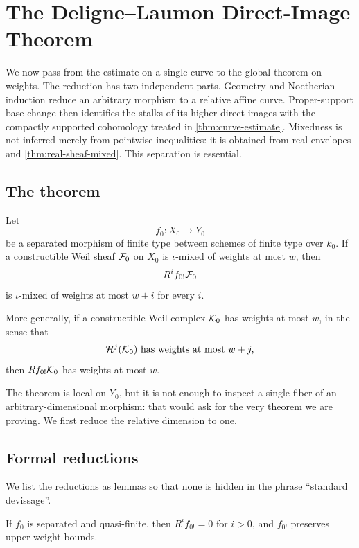 \chapter{The Deligne--Laumon Direct-Image Theorem}
\label{chap:global-weights}

We now pass from the estimate on a single curve to the global theorem on
weights.  The reduction has two independent parts.  Geometry and
Noetherian induction reduce an arbitrary morphism to a relative affine
curve.  Proper-support base change then identifies the stalks of its
higher direct images with the compactly supported cohomology treated in
\cref{thm:curve-estimate}.  Mixedness is not inferred merely from
pointwise inequalities: it is obtained from real envelopes and
\cref{thm:real-sheaf-mixed}.  This separation is essential.

\section{The theorem}

\begin{theorem}
\label{thm:deligne-laumon-direct-image}
Let
\[
  f_0:X_0\longrightarrow Y_0
\]
be a separated morphism of finite type between schemes of finite type
over \(k_0\).  If a constructible Weil sheaf \(\mathcal F_0\) on \(X_0\) is
\(\iota\)-mixed of weights at most \(w\), then
\[
  R^i f_{0!}\mathcal F_0
\]
is \(\iota\)-mixed of weights at most \(w+i\) for every \(i\).

More generally, if a constructible Weil complex \(\mathcal K_0\) has weights at
most \(w\), in the sense that
\[
  \mathcal H^j(\mathcal K_0)\text{ has weights at most }w+j,
\]
then \(Rf_{0!}\mathcal K_0\) has weights at most \(w\).
\end{theorem}

The theorem is local on \(Y_0\), but it is not enough to inspect a single
fiber of an arbitrary-dimensional morphism: that would ask for the very
theorem we are proving.  We first reduce the relative dimension to one.

\section{Formal reductions}

We list the reductions as lemmas so that none is hidden in the phrase
``standard devissage''.

\begin{lemma}
\label{lem:weights-quasifinite}
If \(f_0\) is separated and quasi-finite, then \(R^if_{0!}=0\) for
\(i>0\), and \(f_{0!}\) preserves upper weight bounds.
\end{lemma}

